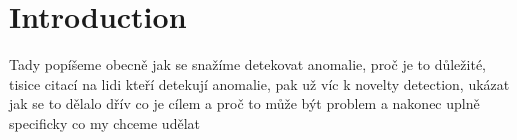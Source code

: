 \section{Introduction}
\label{sec:introduction}
Tady popíšeme obecně jak se snažíme detekovat anomalie, proč je to důležité, tisice citací na lidi kteří detekují anomalie, pak už víc k novelty detection, ukázat jak se to dělalo dřív co je cílem a proč to může být problem a nakonec uplně specificky co my chceme udělat